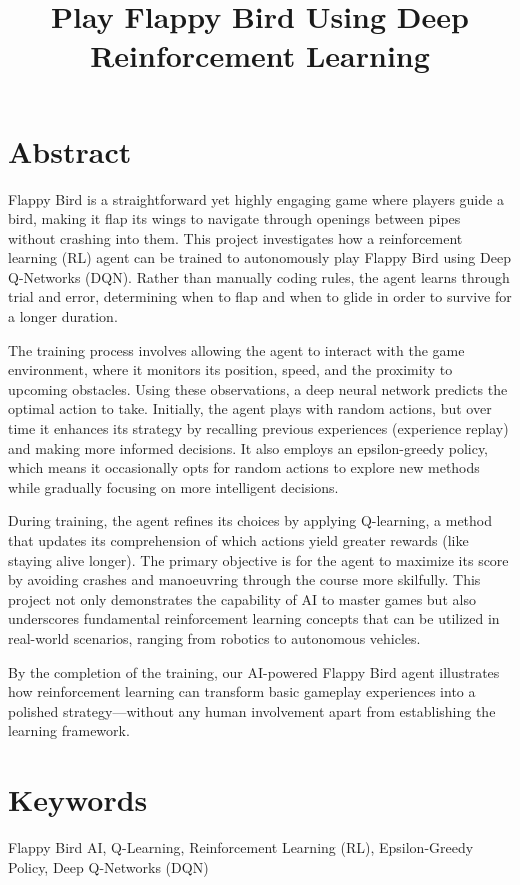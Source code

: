 \documentclass[12pt]{article}
\title{Play Flappy Bird Using Deep Reinforcement Learning}
\date{}
\begin{document}
\maketitle

\section*{Abstract}
Flappy Bird is a straightforward yet highly engaging game where players guide a bird, making it flap its wings to navigate through openings between pipes without crashing into them. This project investigates how a reinforcement learning (RL) agent can be trained to autonomously play Flappy Bird using Deep Q-Networks (DQN). Rather than manually coding rules, the agent learns through trial and error, determining when to flap and when to glide in order to survive for a longer duration.

The training process involves allowing the agent to interact with the game environment, where it monitors its position, speed, and the proximity to upcoming obstacles. Using these observations, a deep neural network predicts the optimal action to take. Initially, the agent plays with random actions, but over time it enhances its strategy by recalling previous experiences (experience replay) and making more informed decisions. It also employs an epsilon-greedy policy, which means it occasionally opts for random actions to explore new methods while gradually focusing on more intelligent decisions.

During training, the agent refines its choices by applying Q-learning, a method that updates its comprehension of which actions yield greater rewards (like staying alive longer). The primary objective is for the agent to maximize its score by avoiding crashes and manoeuvring through the course more skilfully. This project not only demonstrates the capability of AI to master games but also underscores fundamental reinforcement learning concepts that can be utilized in real-world scenarios, ranging from robotics to autonomous vehicles.

By the completion of the training, our AI-powered Flappy Bird agent illustrates how reinforcement learning can transform basic gameplay experiences into a polished strategy—without any human involvement apart from establishing the learning framework.


\section*{Keywords}
Flappy Bird AI, Q-Learning, Reinforcement Learning (RL), Epsilon-Greedy Policy, Deep Q-Networks (DQN)
\end{document}
